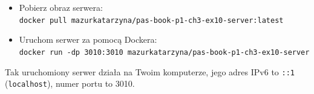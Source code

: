\begin{enumerate}[label=\textbf{3.\arabic*}]
\begin{itemize}
\item Pobierz obraz serwera:\\ \texttt{docker pull mazurkatarzyna/pas-book-p1-ch3-ex10-server:latest}

\item Uruchom serwer za pomocą Dockera:\\ \texttt{docker run -dp 3010:3010 mazurkatarzyna/pas-book-p1-ch3-ex10-server}
\end{itemize}

\noindent Tak uruchomiony serwer działa na Twoim komputerze, jego adres IPv6 to \texttt{::1} (\texttt{localhost}), numer portu to 3010.
\end{enumerate}
